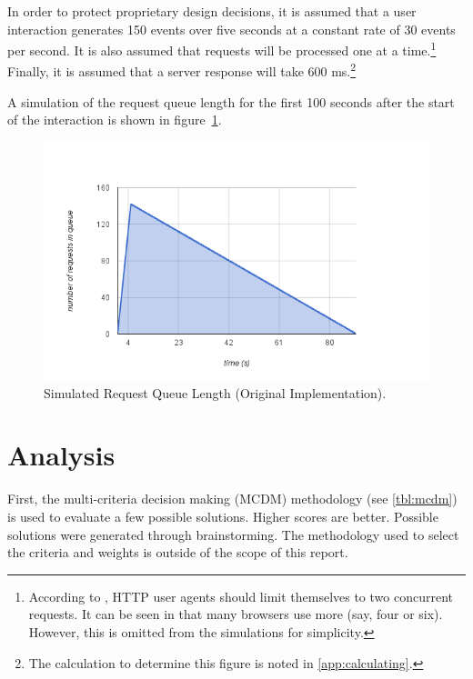 \documentclass[se,resubmit]{uw-wkrpt}
\begin{document}
In order to protect proprietary design decisions, it is assumed that a
user interaction generates 150 events over five seconds at a constant rate
of 30 events per second. It is also assumed that requests will be
processed one at a time.\footnote{According to \cite{ref:http}, HTTP user
agents should limit themselves to two concurrent requests. It can be seen
in \cite{ref:b423377} that many browsers use more (say, four or six).
However, this is omitted from the simulations for simplicity.} Finally, it
is assumed that a server response will take 600 ms.\footnote{The
calculation to determine this figure is noted in \ref{app:calculating}.}

A simulation of the request queue length for the first 100 seconds after
the start of the interaction is shown in figure~\ref{fig:sim-orig}.

\begin{figure}
  \centering
  \includegraphics[width=6.25in]{sim-orig}
  \caption{Simulated Request Queue Length (Original Implementation).}
  \label{fig:sim-orig}
\end{figure}

\section{Analysis}

First, the multi-criteria decision making (MCDM) methodology (see
\ref{tbl:mcdm}) is used to evaluate a few possible solutions. Higher
scores are better. Possible solutions were generated through
brainstorming.  The methodology used to select the criteria and weights is
outside of the scope of this report.
\end{document}
